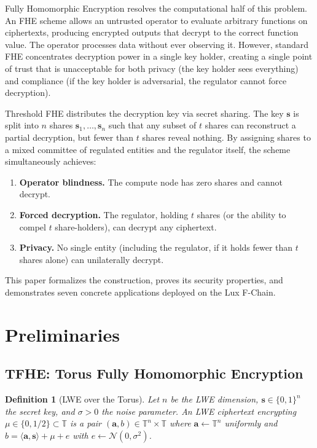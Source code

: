 \documentclass[11pt,a4paper]{article}
\newtheorem{definition}{Definition}[section]
\begin{document}
Fully Homomorphic Encryption resolves the computational half of this
problem.  An FHE scheme allows an untrusted operator to evaluate
arbitrary functions on ciphertexts, producing encrypted outputs that
decrypt to the correct function value.  The operator processes data
without ever observing it.  However, standard FHE concentrates
decryption power in a single key holder, creating a single point of
trust that is unacceptable for both privacy (the key holder sees
everything) and compliance (if the key holder is adversarial, the
regulator cannot force decryption).

Threshold FHE distributes the decryption key via secret sharing.  The
key $\mathbf{s}$ is split into $n$ shares $\mathbf{s}_1, \ldots,
\mathbf{s}_n$ such that any subset of $t$ shares can reconstruct a
partial decryption, but fewer than $t$ shares reveal nothing.  By
assigning shares to a mixed committee of regulated entities and the
regulator itself, the scheme simultaneously achieves:

\begin{enumerate}[nosep]
  \item \textbf{Operator blindness.}  The compute node has zero shares
        and cannot decrypt.
  \item \textbf{Forced decryption.}  The regulator, holding $t$ shares
        (or the ability to compel $t$ share-holders), can decrypt any
        ciphertext.
  \item \textbf{Privacy.}  No single entity (including the regulator,
        if it holds fewer than $t$ shares alone) can unilaterally decrypt.
\end{enumerate}

This paper formalizes the construction, proves its security properties,
and demonstrates seven concrete applications deployed on the Lux
F-Chain.

\section{Preliminaries}
\label{sec:prelim}

\subsection{TFHE: Torus Fully Homomorphic Encryption}

\begin{definition}[LWE over the Torus]
Let $n$ be the LWE dimension, $\mathbf{s} \in \{0,1\}^n$ the secret key,
and $\sigma > 0$ the noise parameter.  An LWE ciphertext encrypting
$\mu \in \{0, 1/2\} \subset \mathbb{T}$ is a pair
$(\mathbf{a}, b) \in \mathbb{T}^n \times \mathbb{T}$ where
$\mathbf{a} \leftarrow \mathbb{T}^n$ uniformly and
$b = \langle \mathbf{a}, \mathbf{s} \rangle + \mu + e$
with $e \leftarrow \mathcal{N}(0, \sigma^2)$.
\end{definition}
\end{document}
